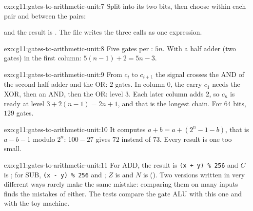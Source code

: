 \begin{solution}{exo:g11:gates-to-arithmetic-unit:7}
Split  into its two bits, then choose within each pair and between the pairs:

\smallskip\noindent\hspace*{2em}

\noindent\hspace*{2em}

\noindent\hspace*{2em}

\smallskip\noindent and the result is . The file  writes the
three calls as one expression.
\end{solution}

\begin{solution}{exo:g11:gates-to-arithmetic-unit:8}
Five gates per : $5n$. With a half adder (two gates) in the first column: $5(n - 1) + 2 = 5n - 3$.
\end{solution}

\begin{solution}{exo:g11:gates-to-arithmetic-unit:9}
From $c_i$ to $c_{i+1}$ the signal crosses the AND of the second half adder and the OR: $2$ gates. In column $0$, the
carry $c_1$ needs the XOR, then an AND, then the OR: level $3$. Each later column adds $2$, so $c_n$ is ready at level
$3 + 2(n - 1) = 2n + 1$, and that is the longest chain. For $64$ bits, $129$ gates.
\end{solution}

\begin{solution}{exo:g11:gates-to-arithmetic-unit:10}
It computes $a + \overline{b} = a + (2^n - 1 - b)$, that is $a - b - 1$ modulo $2^n$: $100 - 27$ gives $72$
instead of $73$. Every result is one too small.
\end{solution}

\begin{solution}{exo:g11:gates-to-arithmetic-unit:11}
For ADD, the result is \texttt{(x + y) \% 256} and $C$ is ; for SUB, \texttt{(x - y) \% 256} and
; $Z$ is  and $N$ is  (). Two versions
written in very different ways rarely make the same mistake: comparing them on many inputs finds the mistakes of
either. The tests compare the gate ALU with this one and with the toy machine.
\end{solution}

